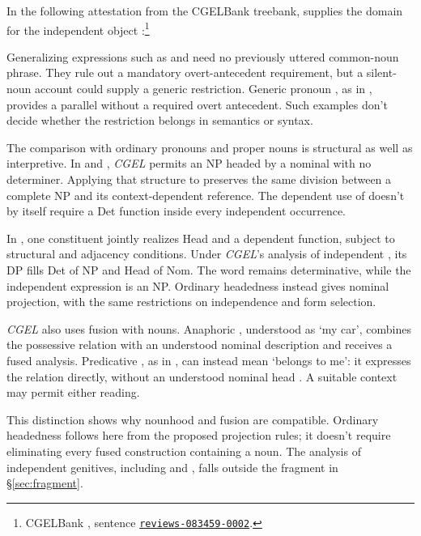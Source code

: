 \documentclass[12pt]{article}
\begin{document}
In the following attestation from the CGELBank treebank,  supplies the domain for the independent object :\footnote{CGELBank \citep{reynolds2023unified}, sentence \href{https://github.com/nert-nlp/cgel/blob/d0a2c2d8c522b23d5aa879fc9cb94948f4285b2c/datasets/ewt.cgel\#L651-L654}{\nolinkurl{reviews-083459-0002}}.}
\ea\label{ex:attested-both}
\z

Generalizing expressions such as  and  need no previously uttered common-noun phrase. They rule out a mandatory overt-antecedent requirement, but a silent-noun account could supply a generic restriction. Generic pronoun , as in , provides a parallel without a required overt antecedent. Such examples don't decide whether the restriction belongs in semantics or syntax.

The comparison with ordinary pronouns and proper nouns is structural as well as interpretive. In  and , \textit{CGEL} permits an NP headed by a nominal with no determiner. Applying that structure to  preserves the same division between a complete NP and its context-dependent reference. The dependent use of  doesn't by itself require a Det function inside every independent occurrence.

In \textcite{Payne2007}, one constituent jointly realizes Head and a dependent function, subject to structural and adjacency conditions. Under \textit{CGEL}'s analysis of independent , its DP fills Det of NP and Head of Nom. The word remains determinative, while the independent expression is an NP. Ordinary headedness instead gives  nominal projection, with the same restrictions on independence and form selection.

\textit{CGEL} also uses fusion with nouns. Anaphoric , understood as \enquote*{my car}, combines the possessive relation with an understood nominal description and receives a fused analysis. Predicative , as in , can instead mean \enquote*{belongs to me}: it expresses the relation directly, without an understood nominal head \citep[410--411, 470--471]{huddleston2002}. A suitable context may permit either reading.

This distinction shows why nounhood and fusion are compatible. Ordinary headedness follows here from the proposed projection rules; it doesn't require eliminating every fused construction containing a noun. The analysis of independent genitives, including  and , falls outside the fragment in §\ref{sec:fragment}.
\end{document}
